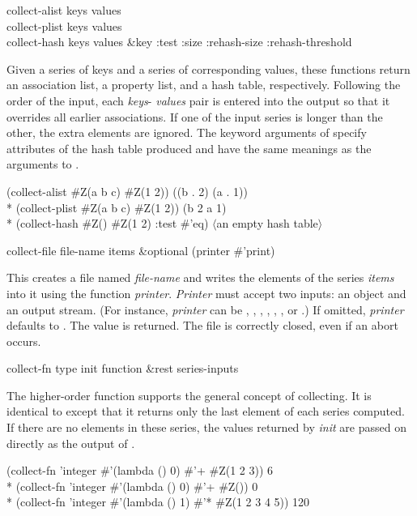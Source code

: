 \begin{defun}[Function]
collect-alist keys values \\
collect-plist keys values \\
collect-hash keys values &key :test :size :rehash-size :rehash-threshold

\noindent Given a series of keys and a series of corresponding values, these
functions return an association list, a property list, and a hash table,
respectively.  Following the order of the input, each \emph{keys}-{\it
values} pair is entered into the output so that it overrides all
earlier associations.  If one of the input series is longer than the other,
the extra elements are ignored.  The keyword arguments of 
 specify attributes of the hash table produced and have the
same meanings as the arguments to .
\begin{lisp}
(collect-alist \#Z(a b c) \#Z(1 2)) {\EV} ((b . 2) (a . 1)) \\*
(collect-plist \#Z(a b c) \#Z(1 2)) {\EV} (b 2 a 1) \\*
(collect-hash \#Z() \#Z(1 2) :test \#'eq) {\EV} {\rm $\langle$an empty hash table$\rangle$}
\end{lisp}
\end{defun}

\begin{defun}[Function]
collect-file file-name items &optional (printer \#'print)

This creates a file named \emph{file-name} and writes the
elements of the series \emph{items} into it using the function {\it
printer}.  \emph{Printer} must accept two inputs: an object
and an output stream.  (For instance, \emph{printer} can be ,
, , , ,
, or .)
If omitted, \emph{printer} defaults to .  The value  is
returned.  The file is correctly closed, even if an abort occurs.
\end{defun}


\begin{defun}[Function]
collect-fn type init function &rest series-inputs

The higher-order function  supports the general concept of
collecting.  It is identical to  except that it
returns only the last element of each series computed.  If there are no elements
in these series, the values returned by \emph{init} are passed on directly
as the output of .
\begin{lisp}
(collect-fn 'integer \#'(lambda () 0) \#'+ \#Z(1 2 3)) {\EV} 6 \\*
(collect-fn 'integer \#'(lambda () 0) \#'+ \#Z()) {\EV} 0 \\*
(collect-fn 'integer \#'(lambda () 1) \#'* \#Z(1 2 3 4 5)) {\EV} 120
\end{lisp}
\end{defun}

